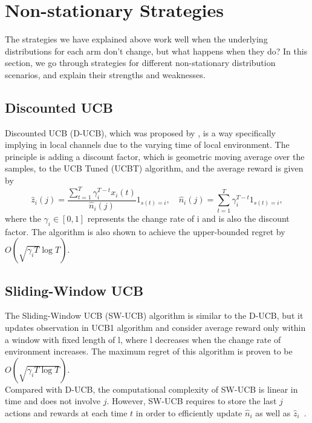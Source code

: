 \section{Non-stationary Strategies}\label{sec:non-stationary-strategies}
The strategies we have explained above work well when the underlying distributions for each arm don't change, but what happens when they do?
In this section, we go through strategies for different non-stationary distribution scenarios, and explain their strengths and weaknesses.

\subsection{Discounted UCB}\label{subsec:discounted-ucb}
Discounted UCB (D-UCB), which was proposed by \citep{kocsis2006discounted}, is a way specifically implying in local channels due to the varying time of local environment.
The principle is adding a discount factor, which is geometric moving average over the samples, to the UCB Tuned (UCBT) algorithm, and the average reward is given by
\begin{equation*}
    \hat{z}_i\left(j\right)=\frac{\sum_{t=1}^T\gamma_i^{T-t}x_i\left(t\right)}{\hat{n}_i\left(j\right)}\mathfrak{1}_{s\left(t\right)=i}, \quad
    {\hat{n}_i\left(j\right)}=\sum_{t=1}^T\gamma_i^{T-t}\mathfrak{1}_{s\left(t\right)=i},
\end{equation*}
where the $\gamma_i \in[0,1]$ represents the change rate of i and is also the discount factor.
The algorithm is also shown to achieve the upper-bounded regret by $O\left(\sqrt{\gamma_{i}T}\log{T}\right)$\citep{garivier2008upper}.

\subsection{Sliding-Window UCB}\label{subsec:sliding-window-ucb}
The Sliding-Window UCB (SW-UCB) algorithm is similar to the D-UCB, but it updates observation in UCB1 algorithm and consider average reward only within a window with fixed length of l, where l decreases when the change rate of environment increases.
The maximum regret of this algorithm is proven to be $O\left(\sqrt{\gamma_{i}T\log{T}}\right)$\citep{garivier2008upper}.
\\Compared with D-UCB, the computational complexity of SW-UCB is linear in time and does not involve $j$.
However, SW-UCB requires to store the last $j$ actions and rewards at each time $t$ in order to efficiently update ${\hat{n}_i}$ as well as ${\hat{z}_i}$~\citep{garivier2008upper}.

